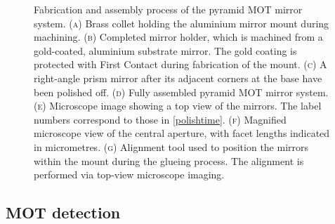 \documentclass[../Thesis-IJspeert.tex]{subfiles}
\begin{document}
\begin{figure}[t]
	\caption[Fabrication and assembly process of the pyramid MOT mirror system]{Fabrication and assembly process of the pyramid MOT mirror system. \textsc{(a)} Brass collet holding the aluminium mirror mount during machining. \textsc{(b)} Completed mirror holder, which is machined from a gold-coated, aluminium substrate mirror. The gold coating is protected with First Contact during fabrication of the mount. \textsc{(c)} A right-angle prism mirror after its adjacent corners at the base have been polished off. \textsc{(d)} Fully assembled pyramid MOT mirror system. \textsc{(e)} Microscope image showing a top view of the mirrors. The label numbers correspond to those in \autoref{polishtime}. \textsc{(f)} Magnified microscope view of the central aperture, with facet lengths indicated in micrometres. \textsc{(g)} Alignment tool used to position the mirrors within the mount during the glueing process. The alignment is performed via top-view microscope imaging.}
	\label{mirror}
\end{figure}

\subsection{MOT detection}
\end{document}
